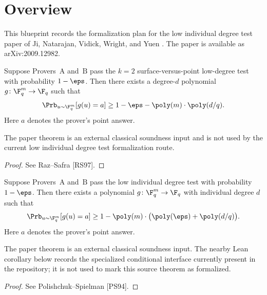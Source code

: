 
\chapter{Overview}
\label{chap:overview}

This blueprint records the formalization plan for the low individual degree
test paper of Ji, Natarajan, Vidick, Wright, and Yuen
\cite{Ji2020LowIndividualDegree}.  The paper is available as
arXiv:2009.12982.

\begin{theorem}\label{thm:raz-safra}
	Suppose Provers~$\mathrm{A}$ and~$\mathrm{B}$ pass the $k=2$ surface-versus-point low-degree test with probability $1-\eps$. Then there exists a degree-$d$ polynomial $g \colon \F_q^m \to \F_q$ such that
	\[
		\Prb_{u \sim \F_q^m}[g(u)=a] \ge 1-\eps-\poly(m)\cdot\poly(d/q).
	\]
	Here $a$ denotes the prover's point answer.
\end{theorem}
\begin{remark}
	The paper theorem is an external classical soundness input and is not used by
	the current low individual degree test formalization route.
\end{remark}
\begin{proof}
	See Raz--Safra [RS97].
\end{proof}

\begin{theorem}\label{thm:classical-test-soundness}
	Suppose Provers~$\mathrm{A}$ and~$\mathrm{B}$ pass the low individual degree test with probability $1-\eps$. Then there exists a polynomial $g \colon \F_q^m \to \F_q$ with individual degree $d$ such that
	\[
		\Prb_{u \sim \F_q^m}[g(u)=a] \ge 1-\poly(m)\cdot\bigl(\poly(\eps)+\poly(d/q)\bigr).
	\]
	Here $a$ denotes the prover's point answer.
\end{theorem}
\begin{remark}
	The paper theorem is an external classical soundness input.  The nearby Lean
	corollary below records the specialized conditional interface currently present
	in the repository; it is not used to mark this source theorem as formalized.
\end{remark}
\begin{proof}
	See Polishchuk--Spielman [PS94].
\end{proof}

